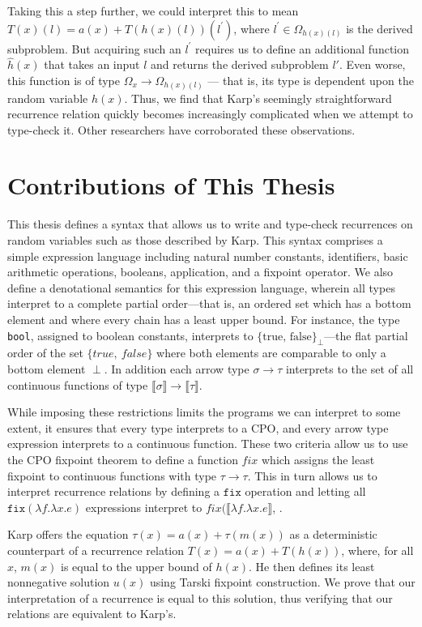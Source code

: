 Taking this a step further, we could interpret this to mean $T(x)(l) = a(x) + T(h(x)(l))(l^\prime)$, where $l^\prime \in 
\Omega_{h(x)(l)}$ is the derived subproblem. But acquiring such an $l^\prime$ requires us to define an 
additional function $\hat{h}(x)$ that takes an input $l$ and returns the derived subproblem $l'$. 
Even worse, this function is of type $\Omega_x \rightarrow \Omega_{h(x)(l)}$ --- that is, its type is dependent 
upon the random variable $h(x)$. Thus, we find that Karp's seemingly straightforward recurrence relation quickly becomes 
increasingly complicated when we attempt to type-check it. Other researchers \cite{Coq} have corroborated 
these observations. 


\section{Contributions of This Thesis}

This thesis defines a syntax that allows us to write and type-check recurrences on
random variables such as those described by Karp. This syntax comprises a simple expression language including natural number constants, identifiers, basic arithmetic operations, booleans, application, and a fixpoint operator. We also define a 
denotational semantics for this expression language, wherein all types interpret to a complete partial order---that is, an ordered
set which has a bottom element and where every chain has a least upper bound. For instance, the type {\tt bool}, assigned
to boolean constants, interprets to $\{\text{true, false}\}_{\perp}$---the flat partial order of the set  $\{true, 
\ false\}$ where
both elements are comparable to only a bottom element $\perp$. In addition each arrow type $\sigma 
\rightarrow \tau$ interprets to the set of all continuous functions of type $\llbracket \sigma \rrbracket \rightarrow 
\llbracket \tau \rrbracket$. 
 
 While imposing these restrictions limits the programs we can interpret to some extent, it ensures 
that every type interprets to a CPO, and every arrow type expression interprets to a continuous function. These two 
criteria allow us to use the CPO fixpoint theorem to define a function $fix$ which assigns the least fixpoint to continuous functions with type $\tau \rightarrow \tau$. This in turn allows us to interpret recurrence relations by defining a $\texttt{fix}$ operation and letting all $\texttt{fix}(\lambda f.\lambda x.e)$ expressions interpret to $fix(\llbracket\lambda f.\lambda x.e\rrbracket$, .

Karp offers the equation $\tau(x) = a(x) + \tau(m(x))$ as a deterministic counterpart of a recurrence relation $T(x) = a(x) + 
T(h(x))$, where, for all $x$, $m(x)$ is equal to the upper bound of $h(x)$. He then defines its least nonnegative solution 
$u(x)$ using Tarski fixpoint construction. We prove that our interpretation of a recurrence is equal to this solution, thus 
verifying that our relations are equivalent to Karp's. 